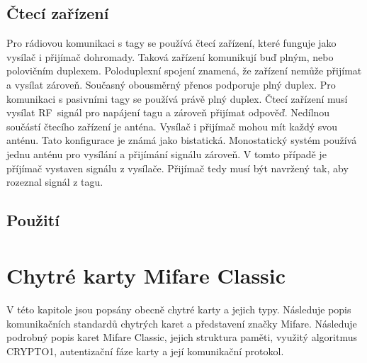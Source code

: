 \section{Čtecí zařízení}
Pro rádiovou komunikaci s tagy se používá čtecí zařízení, které funguje jako vysílač i přijímač dohromady. Taková zařízení komunikují buď plným, nebo polovičním duplexem. Poloduplexní spojení znamená, že zařízení nemůže přijímat a vysílat zároveň. Současný obousměrný přenos podporuje plný duplex. Pro komunikaci s pasivními tagy se používá právě plný duplex. Čtecí zařízení musí vysílat RF~signál pro napájení tagu a zároveň přijímat odpověď.
Nedílnou součástí čtecího zařízení je anténa. Vysílač i přijímač mohou mít každý svou anténu. Tato konfigurace je známá jako bistatická. Monostatický systém používá jednu anténu pro vysílání a přijímání signálu zároveň. V tomto případě je příjímač vystaven signálu z vysílače. Přijímač tedy musí být navržený tak, aby rozeznal signál z tagu\cite{The_RF_in_RFID}.\par

\section{Použití}

\chapter{Chytré karty Mifare Classic\textsuperscript{\textregistered}}
\label{chytre_karty}
V této kapitole jsou popsány obecně chytré karty a jejich typy. Následuje popis komunikačních standardů chytrých karet a představení značky Mifare. Následuje podrobný popis karet Mifare Classic, jejich struktura paměti, využitý algoritmus CRYPTO1, autentizační fáze karty a její komunikační protokol.

